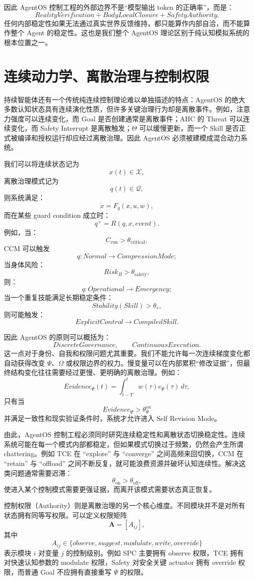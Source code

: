 因此 AgentOS 控制工程的外部边界不是“模型输出 token 的正确率”，而是：
\[
\boxed{
RealityVerification
+
BodyLocalClosure
+
SafetyAuthority.
}
\]
任何内部稳定性如果无法通过真实世界反馈维持，都只能算作内部自洽，而不能算作整个 Agent 的稳定性。这也是我们整个 AgentOS 理论区别于纯认知模拟系统的根本位置之一。

\section{连续动力学、离散治理与控制权限}

持续智能体还有一个传统纯连续控制理论难以单独描述的特点：AgentOS 的绝大多数认知状态具有连续演化性质，但许多关键治理行为却是离散事件。例如，注意力强度可以连续变化，而 Goal 是否创建通常是离散事件；AHC 的 Threat 可以连续变化，而 Safety Interrupt 是离散触发；$\Theta$ 可以缓慢更新，而一个 Skill 是否正式被编译和授权运行却应经过离散治理。因此 AgentOS 必须被建模成混合动力系统。

我们可以将连续状态记为
\[
x(t)\in\mathcal X,
\]
离散治理模式记为
\[
q(t)\in\mathcal Q,
\]
则系统满足：
\[
\dot x
=
F_q(x,u,w),
\]
而在某些 guard condition 成立时：
\[
q^+
=
R(q,x,event).
\]
例如，当：
\[
C_{\mathrm{run}}
>
\theta_{\mathrm{critical}},
\]
CCM 可以触发
\[
q:
Normal
\rightarrow
CompressionMode;
\]
当身体风险：
\[
Risk_B>\theta_{\mathrm{safety}},
\]
则：
\[
q:
Operational
\rightarrow
Emergency;
\]
当一个重复技能满足长期稳定条件：
\[
Stability(Skill)>\theta_s,
\]
则可能触发：
\[
ExplicitControl
\rightarrow
CompiledSkill.
\]

因此 AgentOS 的原则可以概括为：
\[
\boxed{
DiscreteGovernance,\qquad
ContinuousExecution.
}
\]
这一点对于身份、自我和权限问题尤其重要。我们不能允许每一次连续梯度变化都自动获得改变 $\Psi$、$\Omega$ 或权限边界的权力。慢变量可以在内部累积“修改证据”，但最终结构变化往往需要经过更慢、更明确的离散治理。例如：
\[
Evidence_\Psi(t)
=
\int_{t-T}^{t}
w(\tau)e_\Psi(\tau)\,d\tau,
\]
只有当
\[
Evidence_\Psi>\theta_{\Psi}^{on}
\]
并满足一致性和现实验证条件时，系统才允许进入 Self Revision Mode。

由此，AgentOS 控制工程必须同时研究连续稳定性和离散状态切换稳定性。连续系统可能在每一个模式内部都稳定，但如果模式切换过于频繁，仍然会产生所谓 chattering。例如 TCE 在 ``explore'' 与 ``converge'' 之间高频来回切换，CCM 在 ``retain'' 与 ``offload'' 之间不断反复，就可能浪费资源并破坏认知连续性。解决这类问题通常需要迟滞：
\[
\theta_{\mathrm{on}}
>
\theta_{\mathrm{off}},
\]
使进入某个控制模式需要更强证据，而离开该模式需要状态真正恢复。

控制权限（Authority）则是离散治理的另一个核心维度。不同模块并不是对所有状态拥有同等写权限。可以定义权限矩阵
\[
\mathbf A
=
[A_{ij}],
\]
其中
\[
A_{ij}\in
\{
observe,
suggest,
modulate,
write,
override
\}
\]
表示模块 $i$ 对变量 $j$ 的控制级别。例如 SPC 主要拥有 observe 权限，TCE 拥有对快速认知参数的 modulate 权限，Safety 对安全关键 actuator 拥有 override 权限，而普通 Goal 不应拥有直接重写 $\Psi$ 的权限。

